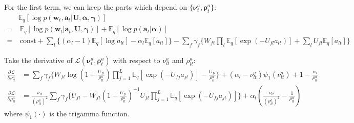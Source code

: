 \documentclass{article} %
\begin{document}
For the first term, we can keep the parts which depend on $\{\bm{\nu}^a_t, \bm{\rho}^a_t\}$:
\begin{align*}
& \mathbb{E}_q [\log p(\bm{w}_t, \bm{a}_t | \mathbf{U}, \bm{\alpha}, \bm{\gamma})]  \\
 = &~ \mathbb{E}_q [\log p(\bm{w}_t | \bm{a}_t, \mathbf{U}, \bm{\gamma})] + \mathbb{E}_q [\log p(\bm{a}_t | \bm{\alpha})]  \\
 = & ~\text{const} + \sum_l  \Big\{ (\alpha_l - 1) \mathbb{E}_q [ \log a_{lt} ] - \alpha_l \mathbb{E}_q [ a_{lt} ] \Big\} -  \sum_f \gamma_f \Big\{W_{ft} \prod_{l} \mathbb{E}_q [ \exp(- U_{fl} a_{lt})] +\sum_l U_{fl} \mathbb{E}_q [ a_{lt}] \Big\} 
\end{align*}

Take the derivative of $\mathcal{L}(\bm{\nu}^a_t, \bm{\rho}^a_t)$ with respect to $\nu_{lt}^a$ and $\rho_{lt}^a$:
\begin{align}
\frac{\partial \mathcal{L}}{\partial \nu_{lt}^a} &= \sum_f \gamma_f \biggl\{ W_{ft}  \log(1 + \frac{U_{fl}}{\rho^a_{lt}}) \prod_{j=1}^L \mathbb{E}_q [\exp(-U_{fj} a_{jt} )] \nonumber -\frac{U_{fl}}{\rho_{lt}^a} \biggl\} + (\alpha_l - \nu_{lt}^a) \psi_1(\nu_{lt}^a) + 1 - \frac{\alpha_l}{\rho^a_{lt}}
\end{align}
\begin{align}
\frac{\partial \mathcal{L}}{\partial \rho_{lt}^a} &= \frac{\nu_{lt}}{(\rho_{lt}^a)^2} \sum_f \gamma_f \biggl\{U_{fl} -W_{ft} (1 + \frac{U_{fl}}{\rho_{lt}^a})^{-1} U_{fl} \nonumber \prod_{j=1}^L \mathbb{E}_q [\exp(- U_{fj} a_{jt} )] \biggl\} + \alpha_l (\frac{\nu_{lt}}{(\rho_{lt}^a)^2} - \frac{1}{\rho_{lt}^a})
\end{align}
where $\psi_1(\cdot)$ is the trigamma function. 
\end{document}
